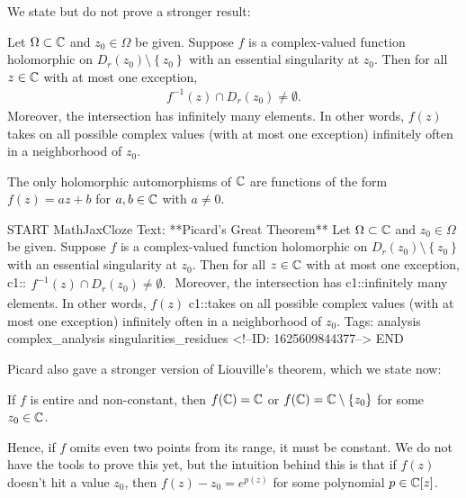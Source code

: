 \documentclass{memoir}
\begin{document}
We state but do not prove a stronger result:
\begin{thm}
	Let \(\Omega \subset \mathbb{C}\) and \(z_0 \in \Omega \) be given. Suppose \(f\) is a complex-valued function holomorphic on \(D_r(z_0)\setminus \left\{ z_0 \right\} \) with an essential singularity at \(z_0\). Then for all \(z \in \mathbb{C}\) with at most one exception,
	\begin{align*}
		f^{-1}(z) \cap D_r(z_0) \neq \emptyset.
	\end{align*}
	Moreover, the intersection has infinitely many elements. In other words, \(f(z)\) takes on all possible complex values (with at most one exception) infinitely often in a neighborhood of \(z_0\).
\end{thm}

\begin{cor}
	The only holomorphic automorphisms of \(\mathbb{C}\) are functions of the form \(f(z) = az+b\) for \(a,b \in \mathbb{C}\) with \(a\neq 0\).
\end{cor}

\begin{anki}
START
MathJaxCloze
Text: **Picard's Great Theorem**
Let \(\Omega \subset \mathbb{C}\) and \(z_0 \in \Omega \) be given. Suppose \(f\) is a complex-valued function holomorphic on \(D_r(z_0)\setminus \left\{ z_0 \right\} \) with an essential singularity at \(z_0\). Then for all \(z \in \mathbb{C}\) with at most one exception,
{{c1::\(\begin{align*}
        	f^{-1}(z) \cap D_r(z_0) \neq \emptyset.
        \end{align*}\)}}
Moreover, the intersection has {{c1::infinitely many elements}}. In other words, \(f(z)\) {{c1::takes on all possible complex values (with at most one exception) infinitely often}} in a neighborhood of \(z_0\).
Tags: analysis complex_analysis singularities_residues
<!--ID: 1625609844377-->
END
\end{anki}


Picard also gave a stronger version of Liouville's theorem, which we state now:
\begin{thm}
	If \(f\) is entire and non-constant, then \(f(\mathbb{C}) = \mathbb{C}\) or \(f(\mathbb{C}) = \mathbb{C}\setminus\left\{ z_0 \right\} \) for some \(z_0 \in \mathbb{C}\).
\end{thm}
Hence, if \(f\) omits even two points from its range, it must be constant. We do not have the tools to prove this yet, but the intuition behind this is that if \(f(z)\) doesn't hit a value \(z_0\), then \(f(z)-z_0 = e^{p(z)}\) for some polynomial \(p \in \mathbb{C}[z]\).\\
\end{document}

